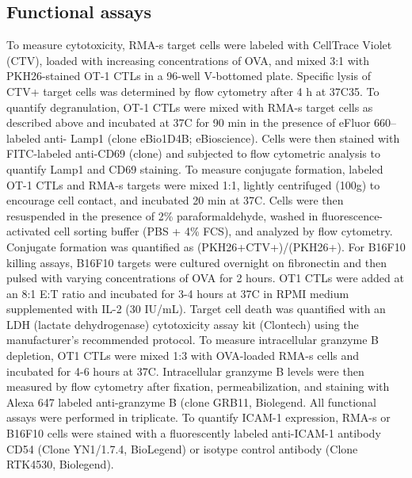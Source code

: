 \subsection{Functional assays}
To measure cytotoxicity, RMA-s target cells were labeled with CellTrace Violet (CTV), loaded with increasing concentrations of OVA, and mixed 3:1 with PKH26-stained OT-1 CTLs in a 96-well V-bottomed plate. Specific lysis of CTV+ target cells was determined by flow cytometry after 4 h at 37\degree C35. To quantify degranulation, OT-1 CTLs were mixed with RMA-s target cells as described above and incubated at 37\degree C for 90 min in the presence of eFluor 660–labeled anti- Lamp1 (clone eBio1D4B; eBioscience). Cells were then stained with FITC-labeled anti-CD69 (clone) and subjected to flow cytometric analysis to quantify Lamp1 and CD69 staining. To measure conjugate formation, labeled OT-1 CTLs and RMA-s targets were mixed 1:1, lightly centrifuged (100g) to encourage cell contact, and incubated 20 min at 37\degree C. Cells were then resuspended in the presence of 2\% paraformaldehyde, washed in fluorescence-activated cell sorting buffer (PBS + 4\% FCS), and analyzed by flow cytometry. Conjugate formation was quantified as (PKH26+CTV+)/(PKH26+). For B16F10 killing assays, B16F10 targets were cultured overnight on fibronectin and then pulsed with varying concentrations of OVA for 2 hours. OT1 CTLs were added at an 8:1 E:T ratio and incubated for 3-4 hours at 37\degree C in RPMI medium supplemented with IL-2 (30 IU/mL). Target cell death was quantified with an LDH (lactate dehydrogenase) cytotoxicity assay kit (Clontech) using the manufacturer’s recommended protocol. To measure intracellular granzyme B depletion, OT1 CTLs were mixed 1:3 with OVA-loaded RMA-s cells and incubated for 4-6 hours at 37\degree C. Intracellular granzyme B levels were then measured by flow cytometry after fixation, permeabilization, and staining with Alexa 647 labeled anti-granzyme B (clone  GRB11, Biolegend. All functional assays were performed in triplicate. To quantify ICAM-1 expression, RMA-s or B16F10 cells were stained with a fluorescently labeled anti-ICAM-1 antibody CD54 (Clone YN1/1.7.4, BioLegend) or isotype control antibody (Clone RTK4530, Biolegend). 

